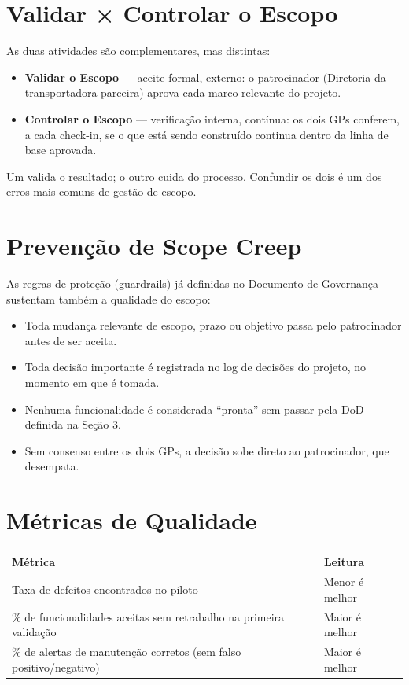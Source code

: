 \documentclass[11pt,a4paper]{article}
\begin{document}
\section{Validar × Controlar o Escopo}
As duas atividades são complementares, mas distintas:
\begin{itemize}[itemsep=3pt]
  \item \textbf{Validar o Escopo} --- aceite formal, externo: o patrocinador (Diretoria da transportadora parceira) aprova cada marco relevante do projeto.
  \item \textbf{Controlar o Escopo} --- verificação interna, contínua: os dois GPs conferem, a cada check-in, se o que está sendo construído continua dentro da linha de base aprovada.
\end{itemize}
\noindent Um valida o resultado; o outro cuida do processo. Confundir os dois é um dos erros mais comuns de gestão de escopo.

\section{Prevenção de Scope Creep}
As regras de proteção (guardrails) já definidas no Documento de Governança sustentam também a qualidade do escopo:
\begin{itemize}[itemsep=2pt]
  \item Toda mudança relevante de escopo, prazo ou objetivo passa pelo patrocinador antes de ser aceita.
  \item Toda decisão importante é registrada no log de decisões do projeto, no momento em que é tomada.
  \item Nenhuma funcionalidade é considerada ``pronta'' sem passar pela DoD definida na Seção 3.
  \item Sem consenso entre os dois GPs, a decisão sobe direto ao patrocinador, que desempata.
\end{itemize}

\section{Métricas de Qualidade}
\begin{center}
\begin{tabularx}{\textwidth}{L l}
\toprule
\textbf{Métrica} & \textbf{Leitura} \\
\midrule
Taxa de defeitos encontrados no piloto & Menor é melhor \\
\% de funcionalidades aceitas sem retrabalho na primeira validação & Maior é melhor \\
\% de alertas de manutenção corretos (sem falso positivo/negativo) & Maior é melhor \\
\bottomrule
\end{tabularx}
\end{center}
\end{document}
